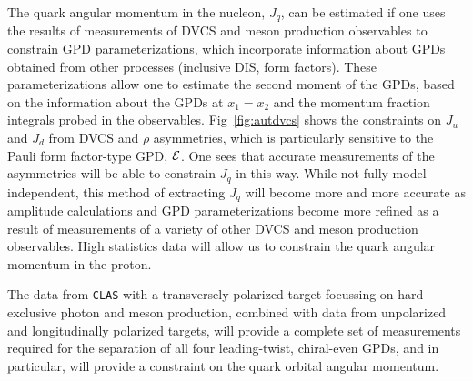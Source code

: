 The quark angular momentum in the nucleon, $J_q$, can be estimated if one 
uses the results of measurements of DVCS and meson production observables to 
constrain GPD parameterizations, which incorporate information about GPDs 
obtained from other processes (inclusive DIS, form factors). These 
parameterizations allow one to estimate the second moment of the GPDs, based 
on the information about the GPDs at $x_1 = x_2$ and the momentum fraction 
integrals probed in the observables. Fig~\ref{fig:autdvcs} shows the
constraints on $J_u$ and $J_d$ from DVCS and $\rho$ asymmetries, which is 
particularly sensitive to the Pauli form factor-type GPD, $\cal E$.  One sees 
that accurate measurements of the asymmetries will be able to constrain $J_q$ 
in this way. While not fully model--independent, this method of extracting 
$J_q$ will become more and more accurate as amplitude calculations and GPD 
parameterizations become more refined as a result of measurements of a 
variety of other DVCS and meson production observables.  High statistics data 
will allow us to constrain the quark angular momentum in the proton.

The data from {\tt CLAS} with a transversely polarized target focussing
on hard exclusive photon and meson production, combined with data from 
unpolarized and longitudinally polarized targets, will provide a complete set 
of measurements required for the separation of all four leading-twist,
chiral-even GPDs, and in particular, will provide a constraint on the quark 
orbital angular momentum.

